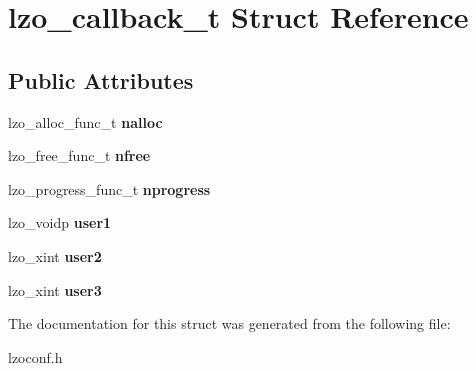 \hypertarget{structlzo__callback__t}{\section{lzo\-\_\-callback\-\_\-t \-Struct \-Reference}
\label{structlzo__callback__t}
}
\subsection*{\-Public \-Attributes}
\begin{DoxyCompactItemize}
\item 
\hypertarget{structlzo__callback__t_a7f281bfec2312f2054c2a15d49c09b56}{lzo\-\_\-alloc\-\_\-func\-\_\-t {\bfseries nalloc}}\label{structlzo__callback__t_a7f281bfec2312f2054c2a15d49c09b56}

\item 
\hypertarget{structlzo__callback__t_a93978ecc3d85de75f10b201a9c2f7774}{lzo\-\_\-free\-\_\-func\-\_\-t {\bfseries nfree}}\label{structlzo__callback__t_a93978ecc3d85de75f10b201a9c2f7774}

\item 
\hypertarget{structlzo__callback__t_ad5c5b6501cc910459de59f94ab48cc23}{lzo\-\_\-progress\-\_\-func\-\_\-t {\bfseries nprogress}}\label{structlzo__callback__t_ad5c5b6501cc910459de59f94ab48cc23}

\item 
\hypertarget{structlzo__callback__t_afd2b658155fcc08bb69a502d9f2038b6}{lzo\-\_\-voidp {\bfseries user1}}\label{structlzo__callback__t_afd2b658155fcc08bb69a502d9f2038b6}

\item 
\hypertarget{structlzo__callback__t_a1ae5d600b4950edcd1d2c72fa68dfbb3}{lzo\-\_\-xint {\bfseries user2}}\label{structlzo__callback__t_a1ae5d600b4950edcd1d2c72fa68dfbb3}

\item 
\hypertarget{structlzo__callback__t_abcd989d85d17bf03803772b791d4af6d}{lzo\-\_\-xint {\bfseries user3}}\label{structlzo__callback__t_abcd989d85d17bf03803772b791d4af6d}

\end{DoxyCompactItemize}


\-The documentation for this struct was generated from the following file\-:\begin{DoxyCompactItemize}
\item 
lzoconf.\-h\end{DoxyCompactItemize}
